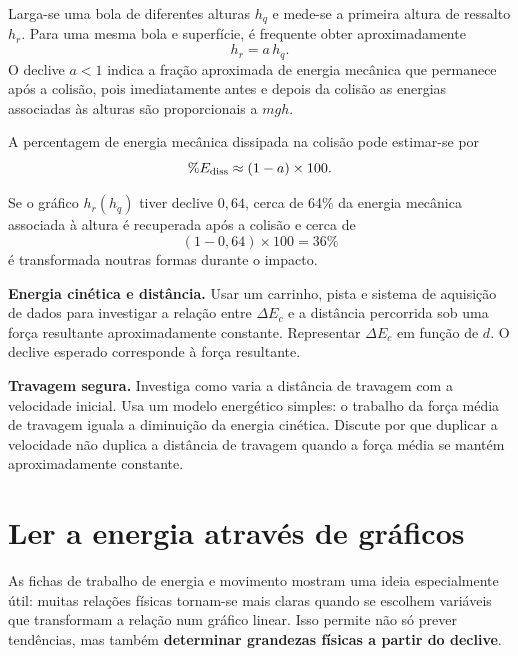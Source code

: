 \documentclass[11pt,a4paper,oneside]{book}
\begin{document}
\begin{atividade}[title=AL 1.2 -- Queda e ressalto de uma bola]
Larga-se uma bola de diferentes alturas $h_q$ e mede-se a primeira altura de ressalto $h_r$. Para uma mesma bola e superfície, é frequente obter aproximadamente
\[
h_r=a\,h_q.
\]
O declive $a<1$ indica a fração aproximada de energia mecânica que permanece após a colisão, pois imediatamente antes e depois da colisão as energias associadas às alturas são proporcionais a $mgh$.

A percentagem de energia mecânica dissipada na colisão pode estimar-se por
\[
\%E_{\rm diss}\approx(1-a)\times100.
\]
\end{atividade}

\begin{exemplo}[title=Exemplo resolvido -- ressalto]
Se o gráfico $h_r(h_q)$ tiver declive $0{,}64$, cerca de 64\% da energia mecânica associada à altura é recuperada após a colisão e cerca de
\[
(1-0{,}64)\times100=36\%
\]
é transformada noutras formas durante o impacto.
\end{exemplo}

\begin{atividade}[title=Extensão -- energia cinética e distância]
\textbf{Energia cinética e distância.} Usar um carrinho, pista e sistema de aquisição de dados para investigar a relação entre $\Delta E_c$ e a distância percorrida sob uma força resultante aproximadamente constante. Representar $\Delta E_c$ em função de $d$. O declive esperado corresponde à força resultante.
\end{atividade}

\begin{stem}
\textbf{Travagem segura.} Investiga como varia a distância de travagem com a velocidade inicial. Usa um modelo energético simples: o trabalho da força média de travagem iguala a diminuição da energia cinética. Discute por que duplicar a velocidade não duplica a distância de travagem quando a força média se mantém aproximadamente constante.
\end{stem}


\section{Ler a energia através de gráficos}
As fichas de trabalho de energia e movimento mostram uma ideia especialmente útil: muitas relações físicas tornam-se mais claras quando se escolhem variáveis que transformam a relação num gráfico linear. Isso permite não só prever tendências, mas também \textbf{determinar grandezas físicas a partir do declive}.
\end{document}
